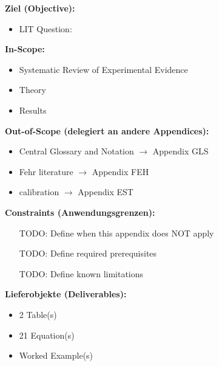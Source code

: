 

\begin{tcolorbox}[
    colback=orange!5!white,
    colframe=orange!75!black,
    title={\textbf{Appendix Scope: Ziel / In-Scope / Out-of-Scope / Constraints}},
    fonttitle=\bfseries
]

\textbf{Ziel (Objective):}
\begin{itemize}[nosep]
    \item LIT Question:
\end{itemize}

\textbf{In-Scope:}
\begin{itemize}[nosep]
    \item Systematic Review of Experimental Evidence
    \item Theory
    \item Results
\end{itemize}

\textbf{Out-of-Scope (delegiert an andere Appendices):}
\begin{itemize}[nosep]
    \item Central Glossary and Notation $\rightarrow$ Appendix GLS
    \item Fehr literature $\rightarrow$ Appendix FEH
    \item calibration $\rightarrow$ Appendix EST
\end{itemize}

\textbf{Constraints (Anwendungsgrenzen):}
\begin{itemize}[nosep]
    \item [TODO: Define when this appendix does NOT apply]
    \item [TODO: Define required prerequisites]
    \item [TODO: Define known limitations]
\end{itemize}

\textbf{Lieferobjekte (Deliverables):}
\begin{itemize}[nosep]
    \item 2 Table(s)
    \item 21 Equation(s)
    \item Worked Example(s)
\end{itemize}

\end{tcolorbox}


